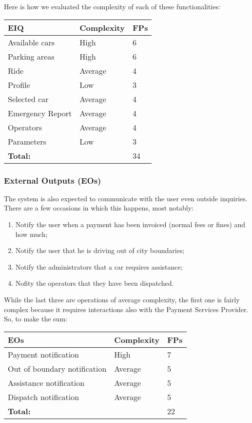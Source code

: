 Here is how we evaluated the complexity of each of these functionalities:\\

	\begin{tabular}{|l|l|l|}
		\hline
		\textbf{EIQ} & \textbf{Complexity} & \textbf{FPs}\\ \hline
		Available cars & High & 6\\ \hline
		Parking areas & High & 6\\ \hline
		Ride & Average & 4\\ \hline
		Profile & Low & 3\\ \hline
		Selected car & Average & 4\\ \hline
		Emergency Report & Average & 4\\ \hline
		Operators & Average & 4\\ \hline
		Parameters & Low & 3\\ \hline
		\multicolumn{2}{|l|}{\textbf{Total:}}& 34 \\ \hline
	\end{tabular}



\subsubsection{External Outputs (EOs)}
The system is also expected to communicate with the user even outside inquiries. There are a few occasions in which this happens, most notably:

	\begin{enumerate}
		\item Notify the user when a payment has been invoiced (normal fees or fines) and how much;
		\item Notify the user that he is driving out of city boundaries;
		\item Notify the administrators that a car requires assistance; %
		\item Nofity the operators that they have been dispatched.
	\end{enumerate}

While the last three are operations of average complexity, the first one is fairly complex because it requires interactions also with the Payment Services Provider. So, to make the sum:\\

	\begin{tabular}{|l|l|l|}
		\hline
		\textbf{EOs} & \textbf{Complexity} & \textbf{FPs}\\ \hline
		Payment notification & High & 7\\ \hline
		Out of boundary notification & Average & 5\\ \hline
		Assistance notification & Average & 5\\ \hline
		Dispatch notification & Average & 5\\ \hline
		\multicolumn{2}{|l|}{\textbf{Total:}}& 22 \\ \hline
	\end{tabular}


